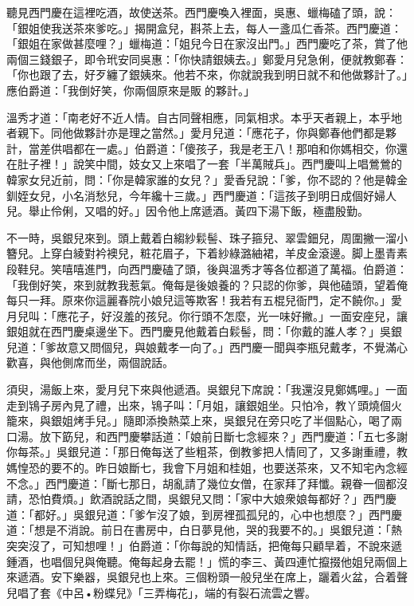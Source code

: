 聽見西門慶在這裡吃酒，故使送茶。西門慶喚入裡面，吳惠、蠟梅磕了頭，說：「銀姐使我送茶來爹吃。」揭開盒兒，斟茶上去，每人一盞瓜仁香茶。西門慶道：「銀姐在家做甚麼哩？」蠟梅道：「姐兒今日在家沒出門。」西門慶吃了茶，賞了他兩個三錢銀子，即令玳安同吳惠：「你快請銀姨去。」鄭愛月兒急俐，便就教鄭春：「你也跟了去，好歹纏了銀姨來。他若不來，你就說我到明日就不和他做夥計了。」應伯爵道：「我倒好笑，你兩個原來是販𣬼的夥計。」

{}溫秀才道：「南老好不近人情。自古同聲相應，同氣相求。{}本乎天者親上，本乎地者親下。{}同他做夥計亦是理之當然。」愛月兒道：「應花子，你與鄭春他們都是夥計，當差供唱都在一處。」伯爵道：「傻孩子，我是老王八！那咱和你媽相交，你還在肚子裡！」說笑中間，妓女又上來唱了一套「半萬賊兵」。西門慶叫上唱鶯鶯的韓家女兒近前，問：「你是韓家誰的女兒？」愛香兒說：「爹，你不認的？他是韓金釧姪女兒，小名消愁兒，今年纔十三歲。」西門慶道：「這孩子到明日成個好婦人兒。舉止伶俐，又唱的好。」因令他上席遞酒。黃四下湯下飯，極盡殷勤。

不一時，吳銀兒來到。頭上戴着白縐紗鬏髻、珠子箍兒、翠雲鈿兒，周圍撇一溜小簪兒。上穿白綾對衿襖兒，粧花眉子，下着紗綠潞紬裙，羊皮金滾邊。脚上墨青素段鞋兒。{}笑嘻嘻進門，向西門慶磕了頭，後與溫秀才等各位都道了萬福。伯爵道：「我倒好笑，來到就教我惹氣。俺每是後娘養的？只認的你爹，與他磕頭，望着俺每只一拜。原來你這麗春院小娘兒這等欺客！我若有五棍兒衙門，定不饒你。」{}愛月兒叫：「應花子，好沒羞的孩兒。你行頭不怎麼，光一味好撇。」一面安座兒，讓銀姐就在西門慶桌邊坐下。西門慶見他戴着白鬏髻，問：「你戴的誰人孝？」吳銀兒道：「爹故意又問個兒，與娘戴孝一向了。」西門慶一聞與李瓶兒戴孝，不覺滿心歡喜，與他側席而坐，兩個說話。

須臾，湯飯上來，愛月兒下來與他遞酒。吳銀兒下席說：「我還沒見鄭媽哩。」一面走到鴇子房內見了禮，出來，鴇子叫：「月姐，讓銀姐坐。只怕冷，教丫頭燒個火籠來，與銀姐烤手兒。」隨即添換熱菜上來，吳銀兒在旁只吃了半個點心，喝了兩口湯。放下筯兒，和西門慶攀話道：「娘前日斷七念經來？」西門慶道：「五七多謝你每茶。」吳銀兒道：「那日俺每送了些粗茶，倒教爹把人情囘了，又多謝重禮，教媽惶恐的要不的。昨日娘斷七，我會下月姐和桂姐，也要送茶來，又不知宅內念經不念。」西門慶道：「斷七那日，胡亂請了幾位女僧，在家拜了拜懺。親眷一個都沒請，恐怕費煩。」飲酒說話之間，吳銀兒又問：「家中大娘衆娘每都好？」西門慶道：「都好。」吳銀兒道：「爹乍沒了娘，到房裡孤孤兒的，心中也想麼？{}」西門慶道：「想是不消說。前日在書房中，白日夢見他，哭的我要不的。」吳銀兒道：「熱突突沒了，可知想哩！」伯爵道：「你每說的知情話，把俺每只顧旱着，不說來遞鍾酒，也唱個兒與俺聽。俺每起身去罷！」慌的李三、黃四連忙攛掇他姐兒兩個上來遞酒。安下樂器，吳銀兒也上來。三個粉頭一般兒坐在席上，躧着火盆，合着聲兒唱了套《中呂•粉蝶兒》「三弄梅花」，端的有裂石流雲之響。

